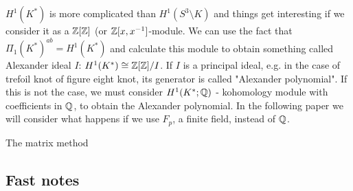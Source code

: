 $H^1(K^*)$ is more complicated than $H^1(S^3\setminus K)$ and things get interesting if we consider it as a $\operatorname{\mathbb{Z}}[\operatorname{\mathbb{Z}}]$ (or $\operatorname{\mathbb{Z}}[x, x^{-1}]$-module. We can use the fact that $\Pi_1(K^*)^{ab}=H^1(K^*)$ and calculate this module to obtain something called Alexander ideal $I$: $H^1(K^*)\cong \operatorname{\mathbb{Z}}[\operatorname{\mathbb{Z}}]/I$. If $I$ is a principal ideal, e.g. in the case of trefoil knot of figure eight knot, its generator is called "Alexander polynomial". If this is not the case, we must consider $H^1(K^*; \operatorname{\mathbb{Q}})$ - kohomology module with coefficients in $\operatorname{\mathbb{Q}}$, to obtain the Alexander polynomial. In the following paper we will consider what happens if we use $F_p$, a finite field, instead of $\operatorname{\mathbb{Q}}$.

The matrix method

\subsection{Fast notes}

